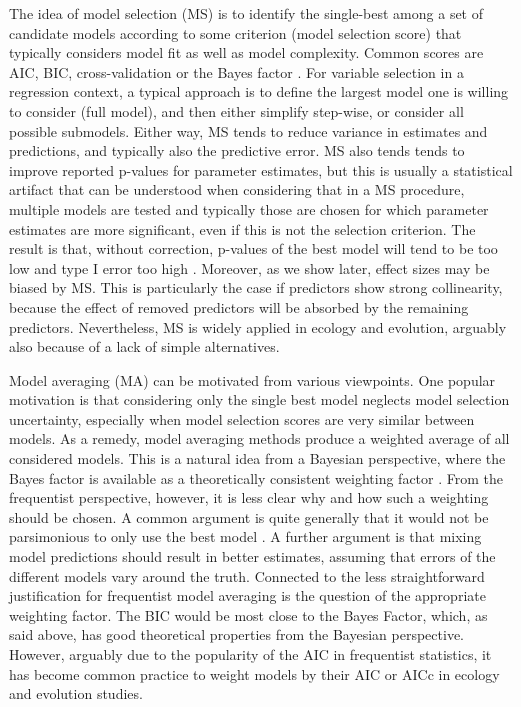 \documentclass[5p]{elsarticle}
\begin{document}
The idea of model selection (MS) is to identify the single-best among a set of candidate models according to some criterion (model selection score) that typically considers model fit as well as model complexity. Common scores are AIC, BIC, cross-validation or the Bayes factor \citep[see, e.g,]{Johnson-Modelselectionin-2004}. For variable selection in a regression context, a typical approach is to define the largest model one is willing to consider (full model), and then either simplify step-wise, or consider all possible submodels. Either way, MS tends to reduce variance in estimates and predictions, and typically also the predictive error. MS also tends tends to improve reported p-values for parameter estimates, but this is usually a statistical artifact that can be understood when considering that in a MS procedure, multiple models are tested and typically those are chosen for which parameter estimates are more significant, even if this is not the selection criterion. The result is that, without correction, p-values of the best model will tend to be too low and type I error too high \citep{Freedman-NoteScreeningRegression-1983, Mundry-StepwiseModelFitting-2009}. Moreover, as we show later, effect sizes may be biased by MS. This is particularly the case if predictors show strong collinearity, because the effect of removed predictors will be absorbed by the remaining predictors. Nevertheless, MS is widely applied in ecology and evolution, arguably also because of a lack of simple alternatives.

Model averaging (MA) can be motivated from various viewpoints. One popular motivation is that considering only the single best model neglects model selection uncertainty, especially when model selection scores are very similar between models. As a remedy, model averaging methods produce a weighted average of all considered models. This is a natural idea from a Bayesian perspective, where the Bayes factor is available as a theoretically consistent weighting factor \citep{Kass-BayesFactors-1995}. From the frequentist perspective, however, it is less clear why and how such a weighting should be chosen. A common argument is quite generally that it would not be parsimonious to only use the best model \citep{Burnham-Modelselectionand-2002}. A further argument is that mixing model predictions should result in better estimates, assuming that errors of the different models vary around the truth. Connected to the less straightforward justification for frequentist model averaging is the question of the appropriate weighting factor. The BIC would be most close to the Bayes Factor, which, as said above, has good theoretical properties from the Bayesian perspective. However, arguably due to the popularity of the AIC in frequentist statistics, it has become common practice to weight models by their AIC or AICc in ecology and evolution studies.
\end{document}
